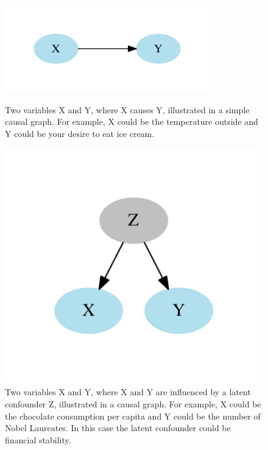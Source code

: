 \documentclass[a4paper,pdf]{article}
\begin{document}
\begin{figure}[!ht]
    \centering
    \begin{minipage}{0.45\textwidth}
        \includegraphics[width=\textwidth]{basiccause}
        \caption{Two variables X and Y, where X causes Y, illustrated in a simple causal graph. For example, X could be the temperature outside and Y could be your desire to eat ice cream. \label{fig:basiccause}}
    \end{minipage}\hfill
    \begin{minipage}{0.45\textwidth}
        \centering
        \includegraphics[width=\textwidth]{commoncause}
        \caption{Two variables X and Y, where X and Y are influenced by a latent confounder Z, illustrated in a causal graph. For example, X could be the chocolate consumption per capita and Y could be the number of Nobel Laureates. In this case the latent confounder could be financial stability.\label{fig:latentconfounder}} 
    \end{minipage}
\end{figure}
\end{document}
